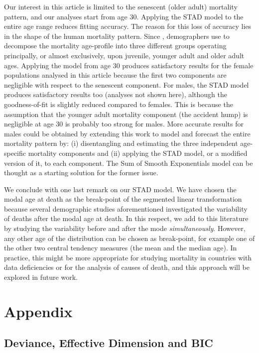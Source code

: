 \documentclass[Thesis]{subfiles}
\begin{document}
Our interest in this article is limited to the senescent (older adult) mortality pattern, and our analyses start from age 30. Applying the STAD model to the entire age range reduces fitting accuracy. The reason for this loss of accuracy lies in the
shape of the human mortality pattern. Since
\cite{thiele1871mathematical}, demographers use to decompose the mortality
age-profile into three different groups operating
principally, or almost exclusively, upon juvenile, younger adult and
older adult ages. Applying the model
from age 30 produces satisfactory results for the female populations analysed in this article because the first two components are negligible with respect to the senescent component. For males, the STAD model produces satisfactory results too (analyses not shown here), although the goodness-of-fit is slightly reduced compared to females. This is because the assumption that the younger adult mortality component (the accident hump) is negligible at age 30 is probably too strong for males. More accurate results for males could be obtained by extending this work to model and forecast the entire mortality pattern by: (i) disentangling
and estimating the three independent age-specific mortality components
and (ii) applying the STAD model, or a modified version of it, to each component. The Sum of Smooth
Exponentials model \citep{camarda2016sums} can be thought as a
starting solution for the former issue. 

We conclude with one last remark on our STAD model. We have chosen the
modal age at death as the break-point of the segmented linear
transformation because several demographic studies aforementioned
investigated the variability of deaths after the modal age at
death. In this respect, we add to this literature by studying the
variability before and after the mode \emph{simultaneously}. However,
any other age of the distribution can be chosen as break-point,
for example one of the other two central tendency measures (the mean
and the median age). In practice, this might be more appropriate for
studying mortality in countries with data deficiencies or for the analysis of
causes of death, and this approach will be explored in future work. 

\section{Appendix}\label{Sec:Ch3Appendix}

\subsection{Deviance, Effective Dimension and BIC}\label{Subsec:Ch3appA}
\end{document}
